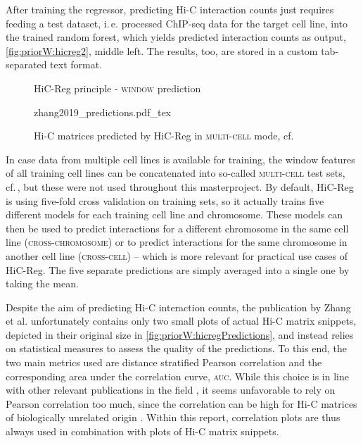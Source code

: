 After training the regressor, predicting Hi-C interaction counts just requires feeding a test dataset, 
i.\,e. processed ChIP-seq data for the target cell line, into the trained random forest, 
which yields predicted interaction counts as output, \autoref{fig:priorW:hicreg2}, middle left. 
The results, too, are stored in a custom tab-separated text format.
\begin{figure}[p]
\centering
 \caption{HiC-Reg principle - \textsc{window} prediction}
 \label{fig:priorW:hicreg2}
\end{figure}
\begin{figure}[p]
\tiny
\centering
 {zhang2019_predictions.pdf_tex}
 \caption[Hi-C matrices predicted by HiC-Reg]{Hi-C matrices predicted by HiC-Reg in \textsc{multi-cell} mode, cf.\,\cite[p.\,9]{Zhang2019}}
 \label{fig:priorW:hicregPredictions}
\end{figure}

In case data from multiple cell lines is available for training,
the window features of all training cell lines can be concatenated into so-called \textsc{multi-cell} test sets, 
cf.\,\cite[Fig. 1]{Zhang2019}, but these were not used throughout this masterproject.
By default, HiC-Reg is using five-fold cross validation on training sets, 
so it actually trains five different models for each training cell line and chromosome.
These models can then be used to predict interactions for a different
chromosome in the same cell line (\textsc{cross-chromosome}) or to predict interactions for the same chromosome in 
another cell line (\textsc{cross-cell}) -- which is more relevant for practical use cases of HiC-Reg.
The five separate predictions are simply averaged into a single one by taking the mean.

Despite the aim of predicting Hi-C interaction counts, the publication by Zhang et al. unfortunately contains only two small plots 
of actual Hi-C matrix snippets, depicted in their original size in \autoref{fig:priorW:hicregPredictions}, 
and instead relies on statistical measures to assess the quality of the predictions.
To this end, the two main metrics used are distance stratified Pearson 
correlation and the corresponding area under the correlation curve, \textsc{auc}.
While this choice is in line with other relevant publications in the field \cite{Pierro2017, Farre2018, Schwessinger2019},
it seems unfavorable to rely on Pearson correlation too much, since the correlation can be high for Hi-C matrices
of biologically unrelated origin \cite{Yang2017}. 
Within this report, correlation plots are thus always used in combination with plots of Hi-C matrix snippets.

